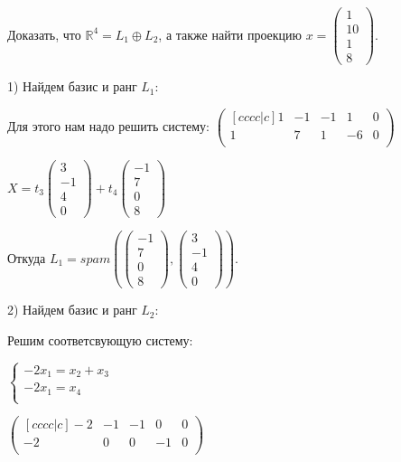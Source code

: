 \documentclass{article}
\begin{document}
Доказать, что $\mathbb{R}^4  = L_1 \oplus L_2$, а также найти проекцию $x = \begin{pmatrix}
    1\\
    10\\
    1\\
    8
\end{pmatrix}$.

1) Найдем базис и ранг $L_1$:

Для этого нам надо решить систему:  
$\begin{pmatrix}[cccc|c]
    1 & -1 & -1 & 1 & 0\\
    1 & 7 & 1 & -6 & 0 \\
\end{pmatrix}$

$X = t_3\begin{pmatrix}
    3\\
    -1\\
    4 \\
    0
\end{pmatrix} + t_4\begin{pmatrix}
    -1\\
    7\\
    0 \\
    8
\end{pmatrix}$

Откуда $L_1 = spam (\begin{pmatrix}
    -1\\
    7\\
    0 \\
    8
\end{pmatrix}, \begin{pmatrix}
    3\\
    -1\\
    4 \\
    0
\end{pmatrix} )$.

2) Найдем базис и ранг $L_2$:   

Решим соответсвующую систему:

$
\begin{cases}
   -2x_1=x_2 +x_3\\
   -2x_1 = x_4 \\
\end{cases}
$

$
\begin{pmatrix}[cccc|c]
    -2 & -1 & -1 & 0 & 0 \\
    -2 & 0 & 0 & -1 & 0 \\
\end{pmatrix} 
$
\end{document}
